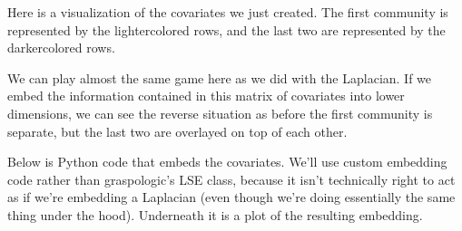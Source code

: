 \documentclass[letterpaper,10pt,english]{jupyterBook}
\begin{document}
\begin{sphinxVerbatim}[commandchars=\\\{\}]
   

   
        

 
       
       
       

        
     
    

  
\end{sphinxVerbatim}

\sphinxAtStartPar
Here is a visualization of the covariates we just created. The first community is represented by the lighter\sphinxhyphen{}colored rows, and the last two are represented by the darker\sphinxhyphen{}colored rows.

\noindent{}

\sphinxAtStartPar
We can play almost the same game here as we did with the Laplacian. If we embed the information contained in this matrix of covariates into lower dimensions, we can see the reverse situation as before \sphinxhyphen{} the first community is separate, but the last two are overlayed on top of each other.

\sphinxAtStartPar
Below is Python code that embeds the covariates. We’ll use custom embedding code rather than graspologic’s LSE class, because it isn’t technically right to act as if we’re embedding a Laplacian (even though we’re doing essentially the same thing under the hood). Underneath it is a plot of the resulting embedding.
\end{document}
